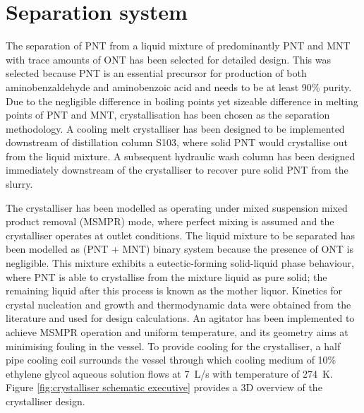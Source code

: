 \section*{Separation system}

The separation of PNT from a liquid mixture of predominantly PNT and MNT with trace amounts of ONT has been selected for detailed design. This was selected because PNT is an essential precursor for production of both aminobenzaldehyde and aminobenzoic acid and needs to be at least 90\% purity. Due to the negligible difference in boiling points yet sizeable difference in melting points of PNT and MNT, crystallisation has been chosen as the separation methodology. A cooling melt crystalliser has been designed to be implemented downstream of distillation column S103, where solid PNT would crystallise out from the liquid mixture. A subsequent hydraulic wash column has been designed immediately downstream of the crystalliser to recover pure solid PNT from the slurry. 


The crystalliser has been modelled as operating under mixed suspension mixed product removal (MSMPR) mode, where perfect mixing is assumed and the crystalliser operates at outlet conditions. The liquid mixture to be separated has been modelled as (PNT + MNT) binary system because the presence of ONT is negligible. This mixture exhibits a eutectic-forming solid-liquid phase behaviour, where PNT is able to crystallise from the mixture liquid as pure solid; the remaining liquid after this process is known as the mother liquor. Kinetics for crystal nucleation and growth and thermodynamic data were obtained from the literature and used for design calculations. An agitator has been implemented to achieve MSMPR operation and uniform temperature, and its geometry aims at minimising fouling in the vessel. To provide cooling for the crystalliser, a half pipe cooling coil surrounds the vessel through which cooling medium of 10\% ethylene glycol aqueous solution flows at \SI{7}{L/s} with temperature of \SI{274}{K}. Figure \ref{fig:crystalliser schematic executive} provides a 3D overview of the crystalliser design.


